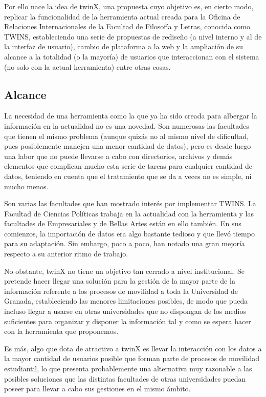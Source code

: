 \documentclass[12pt]{article}
\begin{document}
Por ello nace la idea de twinX, una propuesta cuyo objetivo es, en cierto modo, replicar la funcionalidad de la herramienta actual creada para la Oficina de Relaciones Internacionales de la Facultad de Filosofía y Letras, conocida como TWINS, estableciendo una serie de propuestas de rediseño (a nivel interno y al de la interfaz de usuario), cambio de plataforma a la web y la ampliación de su alcance a la totalidad (o la mayoría) de usuarios que interaccionan con el sistema (no solo con la actual herramienta) entre otras cosas.

\subsection{Alcance}

La necesidad de una herramienta como la que ya ha sido creada para albergar la información en la actualidad no es una novedad. Son numerosas las facultades que tienen el mismo problema (aunque quizás no al mismo nivel de dificultad, pues posiblemente manejen una menor cantidad de datos), pero es desde luego una labor que no puede llevarse a cabo con directorios, archivos y demás elementos que complican mucho esta serie de tareas para cualquier cantidad de datos, teniendo en cuenta que el tratamiento que se da a veces no es simple, ni mucho menos.

Son varias las facultades que han mostrado interés por implementar TWINS. La Facultad de Ciencias Políticas trabaja en la actualidad con la herramienta y las facultades de Empresariales y de Bellas Artes están en ello también. En sus comienzos, la importación de datos era algo bastante tedioso y que llevó tiempo para su adaptación. Sin embargo, poco a poco, han notado una gran mejoría respecto a su anterior ritmo de trabajo.

No obstante, twinX no tiene un objetivo tan cerrado a nivel institucional. Se pretende hacer llegar una solución para la gestión de la mayor parte de la información referente a los procesos de movilidad a toda la Universidad de Granada, estableciendo las menores limitaciones posibles, de modo que pueda incluso llegar a usarse en otras universidades que no dispongan de los medios suficientes para organizar y disponer la información tal y como se espera hacer con la herramienta que proponemos.

Es más, algo que dota de atractivo a twinX es llevar la interacción con los datos a la mayor cantidad de usuarios posible que forman parte de procesos de movilidad estudiantil, lo que presenta probablemente una alternativa muy razonable a las posibles soluciones que las distintas facultades de otras universidades puedan poseer para llevar a cabo sus gestiones en el mismo ámbito.
\end{document}
